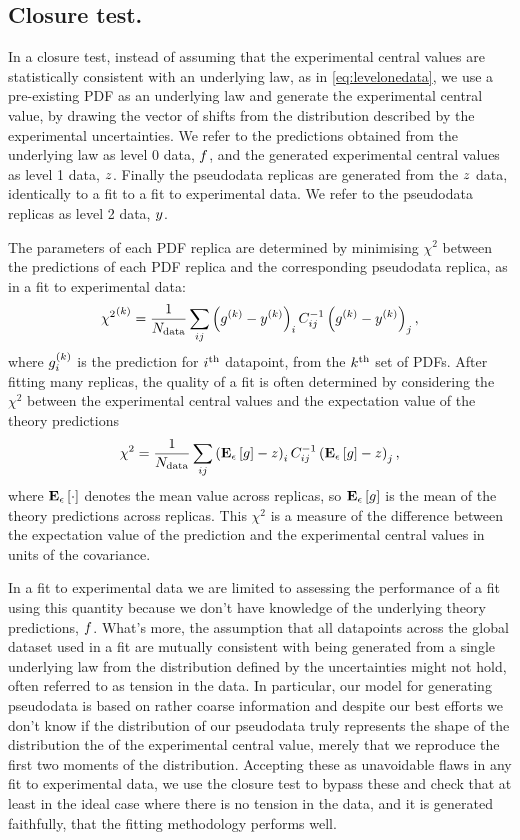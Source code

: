 \subsection{Closure test.}

In a closure test, instead of assuming that the experimental central values are
statistically consistent with an underlying law, as in \eqref{eq:levelonedata},
we use a pre-existing PDF as an underlying law and generate the experimental
central value, by drawing the vector of shifts from the distribution
described by the experimental uncertainties. We refer to the predictions
obtained from the underlying law as level 0 data, $f$, and the generated
experimental central values as level 1 data, $z$. Finally the pseudodata
replicas are generated from the $z$ data, identically to a fit to
a fit to experimental data. We refer to the pseudodata replicas as level 2
data, $y$.

The parameters of each PDF replica are determined by minimising $\chi^2$ between
the predictions of each PDF replica and the corresponding pseudodata replica,
as in a fit to experimental data:
\begin{equation}
    {\chi^2}^{(k)} = \frac{1}{N_{\rm data}} \sum_{ij} \left( g^{(k)} - y^{(k)} \right)_i C^{-1}_{ij} \left( g^{(k)} - y^{(k)} \right)_j,
\end{equation}
where $g^{(k)}_i$ is the prediction for $i^{\rm th}$ datapoint, from
the $k^{\rm th}$ set of PDFs. After fitting many replicas, the quality of a fit
is often determined by considering the $\chi^2$ between the experimental central
values and the expectation value of the theory predictions
\begin{equation}\label{eq:centralchi2}
    \chi^2 = \frac{1}{N_{\rm data}} \sum_{ij} \left( \mathbf{E}_{\epsilon}\left[ g \right] - z \right)_i C^{-1}_{ij} \left( \mathbf{E}_{\epsilon}\left[ g \right] - z \right)_j,
\end{equation}
where $\mathbf{E}_{\epsilon}\left[ \cdot \right]$ denotes the mean value across replicas, so $\mathbf{E}_{\epsilon}\left[ g \right]$ is
the mean of the theory predictions across replicas. This $\chi^2$ is a measure
of the difference between the expectation value of the prediction and the
experimental central values in units of the covariance.

In a fit to experimental data we are limited to assessing the performance of a fit
using this quantity because we don't
have knowledge of the underlying theory predictions, $f$. What's more, the
assumption that all datapoints across the global dataset used in a fit are
mutually consistent with being generated from a single underlying law from
the distribution defined by the uncertainties might not hold, often
referred to as tension in the data. In particular, our model for generating pseudodata
is based on rather coarse information and despite our best efforts we don't know
if the distribution of our pseudodata truly represents the shape of the distribution
the of the experimental central value, merely that we reproduce the first
two moments of the distribution. Accepting these as unavoidable flaws in any
fit to experimental data, we use the closure test to bypass these and check that
at least in the ideal case where there is no tension in the data, and it is
generated faithfully, that the fitting methodology performs well.
